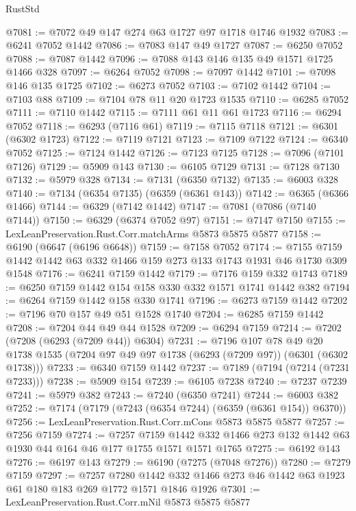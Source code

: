 \begin{lexlean}{RustStd}
\begin{coremodule}
{{@7081 := @7072 @49 @147 @274 @63 @1727 @97 @1718 @1746 @1932
@7083 := @6241 @7052 @1442
@7086 := @7083 @147 @49 @1727
@7087 := @6250 @7052
@7088 := @7087 @1442
@7096 := @7088 @143 @146 @135 @49 @1571 @1725 @1466 @328
@7097 := @6264 @7052
@7098 := @7097 @1442
@7101 := @7098 @146 @135 @1725
@7102 := @6273 @7052
@7103 := @7102 @1442
@7104 := @7103 @88
@7109 := @7104 @78 @11 @20 @1723 @1535
@7110 := @6285 @7052
@7111 := @7110 @1442
@7115 := @7111 @61 @11 @61 @1723
@7116 := @6294 @7052
@7118 := @6293 (@7116 @61)
@7119 := @7115 @7118
@7121 := @6301 (@6302 @1723)
@7122 := @7119 @7121
@7123 := @7109 @7122
@7124 := @6340 @7052
@7125 := @7124 @1442
@7126 := @7123 @7125
@7128 := @7096 (@7101 @7126)
@7129 := @5909 @143
@7130 := @6105 @7129
@7131 := @7128 @7130
@7132 := @5979 @328
@7134 := @7131 (@6350 @7132)
@7135 := @6003 @328
@7140 := @7134 (@6354 @7135) (@6359 (@6361 @143))
@7142 := @6365 (@6366 @1466)
@7144 := @6329 (@7142 @1442)
@7147 := @7081 (@7086 (@7140 @7144))
@7150 := @6329 (@6374 @7052 @97)
@7151 := @7147 @7150
@7155 := LexLeanPreservation.Rust.Corr.matchArms @5873 @5875 @5877
@7158 := @6190 (@6647 (@6196 @6648))
@7159 := @7158 @7052
@7174 := @7155 @7159 @1442 @1442 @63 @332 @1466 @159 @273 @133 @1743 @1931 @46 @1730 @309 @1548
@7176 := @6241 @7159 @1442
@7179 := @7176 @159 @332 @1743
@7189 := @6250 @7159 @1442 @154 @158 @330 @332 @1571 @1741 @1442 @382
@7194 := @6264 @7159 @1442 @158 @330 @1741
@7196 := @6273 @7159 @1442
@7202 := @7196 @70 @157 @49 @51 @1528 @1740
@7204 := @6285 @7159 @1442
@7208 := @7204 @44 @49 @44 @1528
@7209 := @6294 @7159
@7214 := @7202 (@7208 (@6293 (@7209 @44)) @6304)
@7231 := @7196
    @107
    @78
    @49
    @20
    @1738
    @1535
    (@7204 @97 @49 @97 @1738 (@6293 (@7209 @97)) (@6301 (@6302 @1738)))
@7233 := @6340 @7159 @1442
@7237 := @7189 (@7194 (@7214 (@7231 @7233)))
@7238 := @5909 @154
@7239 := @6105 @7238
@7240 := @7237 @7239
@7241 := @5979 @382
@7243 := @7240 (@6350 @7241)
@7244 := @6003 @382
@7252 := @7174 (@7179 (@7243 (@6354 @7244) (@6359 (@6361 @154)) @6370))
@7256 := LexLeanPreservation.Rust.Corr.mCons @5873 @5875 @5877
@7257 := @7256 @7159
@7274 := @7257
    @7159
    @1442
    @332
    @1466
    @273
    @132
    @1442
    @63
    @1930
    @44
    @164
    @46
    @177
    @1755
    @1571
    @1571
    @1765
@7275 := @6192 @143
@7276 := @6197 @143
@7279 := @6190 (@7275 (@7048 @7276))
@7280 := @7279 @7159
@7297 := @7257
    @7280
    @1442
    @332
    @1466
    @273
    @46
    @1442
    @63
    @1923
    @61
    @180
    @183
    @269
    @1772
    @1571
    @1846
    @1926
@7301 := LexLeanPreservation.Rust.Corr.mNil @5873 @5875 @5877
}}
\end{coremodule}
\end{lexlean}
